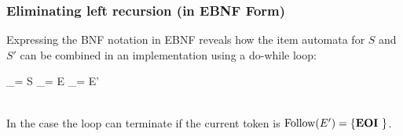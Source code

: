 \subsubsection{Eliminating left recursion (in EBNF Form)}

Expressing the BNF notation in EBNF reveals how the item automata for $S$ and
$S'$ can be combined in an implementation using a do-while loop:

\begin{grammar}
_{= S}
    \produces
	_{= E}
	_{= E'}
	\\
\end{grammar}\\[-0.5cm]
In the case the loop can terminate if the current token is
$\mathrm{Follow}(E') = \{ \lexkeyword{EOI} \}$.

